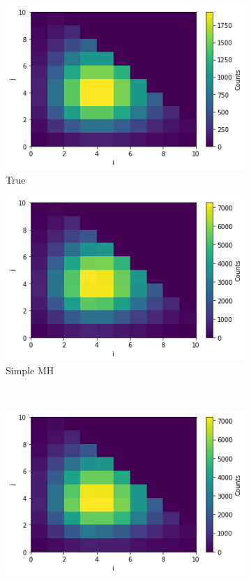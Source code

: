 \begin{figure}[H]
\centering
\begin{subfigure}{.5\textwidth}
  \centering
  \includegraphics[width=.8\linewidth]{figures/truesen.png}
  \caption{True}
\end{subfigure}%
\begin{subfigure}{.5\textwidth}
  \centering
  \includegraphics[width=.8\linewidth]{figures/simplesen.png}
  \caption{Simple MH}
\end{subfigure}\\
\begin{subfigure}{.5\textwidth}
  \centering
  \includegraphics[width=.8\linewidth]{figures/coordinatesen.png}

\end{subfigure}
\end{figure}
